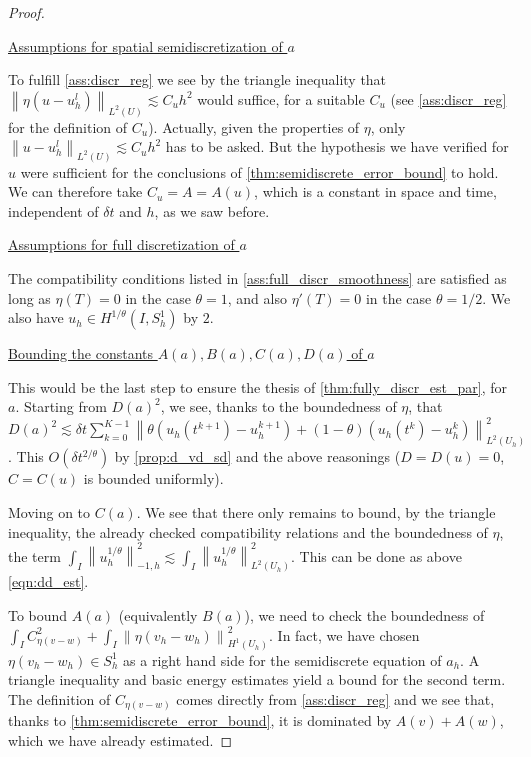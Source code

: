 \documentclass[english,a4paper,10pt,oneside]{scrbook}	%
\theoremstyle{break}
\newenvironment{mproof}[1][\proofname]{%
  \begin{proof}[#1]$ $\par\nobreak\ignorespaces
}{%
  \end{proof}
}
\renewcommand*{\proofname}{Proof}
\theoremstyle{remark}
\newcommand{\ds}{\displaystyle}
\newcommand{\norm}[1]{\left\lVert#1\right\rVert}
\begin{document}
\begin{mproof}
\underline{Assumptions for spatial semidiscretization of $a$}

To fulfill \cref{ass:discr_reg} we see by the triangle inequality that $\norm{\eta(u-u_h^l)}_{L^2(U)}\lesssim C_u h^2$ would suffice, for a suitable $C_u$ (see \cref{ass:discr_reg} for the definition of $C_u$). Actually, given the properties of $\eta$, only $\norm{u-u_h^l}_{L^2(U)}\lesssim C_u h^2$ has to be asked. But the hypothesis we have verified for $u$ were sufficient for the conclusions of \cref{thm:semidiscrete_error_bound} to hold. We can therefore take $C_u = A = A(u)$, which is a constant in space and time, independent of $\delta t$ and $h$, as we saw before.

\underline{Assumptions for full discretization of $a$}

The compatibility conditions listed in \cref{ass:full_discr_smoothness} are satisfied as long as $\eta(T)=0$ in the case $\theta = 1$, and also $\eta'(T)=0$ in the case $\theta=1/2$. We also have $u_h \in H^{1/\theta}(I,S^1_h)$ by $2$.

\underline{Bounding the constants $A(a),B(a),C(a),D(a)$ of $a$}

This would be the last step to ensure the thesis of \cref{thm:fully_discr_est_par}, for $a$. Starting from $D(a)^2$, we see, thanks to the boundedness of $\eta$, that $D(a)^2 \lesssim \delta t \sum_{k=0}^{K-1}\norm{\theta(u_h(t^{k+1})-u_h^{k+1}) + (1-\theta)(u_h(t^k)-u_h^k)}^2_{L^2(U_h)}$. This $O(\delta t^{2/\theta})$ by \cref{prop:d_vd_sd} and the above reasonings ($D=D(u)=0$, $C=C(u)$ is bounded uniformly).

Moving on to $C(a)$. We see that there only remains to bound, by the triangle inequality, the already checked compatibility relations and the boundedness of $\eta$, the term $\ds \int_I\norm{u_h^{1/\theta}}_{-1,h}^2\lesssim \int_I\norm{u_h^{1/\theta}}_{L^2(U_h)}^2$. This can be done as above \cref{eqn:dd_est}.

To bound $A(a)$ (equivalently $B(a)$), we need to check the boundedness of $\ds \int_IC_{\eta(v-w)}^2 + \int_I \norm{\eta(v_h - w_h)}_{H^1(U_h)}^2$. In fact, we have chosen $\eta(v_h - w_h) \in S^1_h$ as a right hand side for the semidiscrete equation of $a_h$. A triangle inequality and basic energy estimates yield a bound for the second term. The definition of $C_{\eta(v-w)}$ comes directly from \cref{ass:discr_reg} and we see that, thanks to \cref{thm:semidiscrete_error_bound}, it is dominated by $A(v)+A(w)$, which we have already estimated.

\end{mproof}
\end{document}

